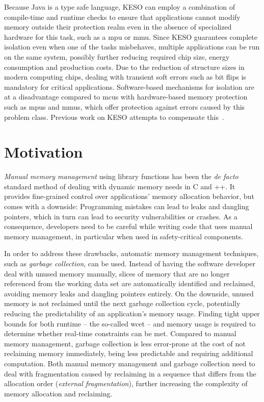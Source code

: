 		Because Java is a type safe language, KESO can employ a combination of compile-time and runtime checks to ensure
		that applications cannot modify memory outside their protection realm even in the absence of specialized hardware
		for this task, such as a \gls{mpu} or \gls{mmu}. Since KESO guarantees complete isolation even when one of the tasks
		misbehaves, multiple applications can be run on the same system, possibly further reducing required chip size,
		energy consumption and production costs. Due to the reduction of structure sizes in modern computing chips, dealing
		with transient soft errors such as bit flips is mandatory for critical applications. Software-based mechanisms for
		isolation are at a disadvantage compared to \glspl{mcu} with hardware-based memory protection such as \glspl{mpu}
		and \glspl{mmu}, which offer protection against errors caused by this problem class. Previous work on KESO attempts
		to compensate this~\cite{thomm:11:jtres, stilkerich:13:lctes}.

	\section{Motivation}
		\label{sec:intro:motivation}

		\emph{Manual memory management} using library functions has been the \emph{de facto} standard method of dealing with
		dynamic memory needs in C and \C++{}. It provides fine-grained control over applications' memory allocation
		behavior, but comes with a downside: Programming mistakes can lead to leaks and dangling pointers, which in turn can
		lead to security vulnerabilities or crashes. As a consequence, developers need to be careful while writing code that
		uses manual memory management, in particular when used in safety-critical components.

		In order to address these drawbacks, automatic memory management techniques, such as \emph{garbage collection}, can
		be used. Instead of having the software developer deal with unused memory manually, slices of memory that are no
		longer referenced from the working data set are automatically identified and reclaimed, avoiding memory leaks and
		dangling pointers entirely. On the downside, unused memory is not reclaimed until the next garbage collection cycle,
		potentially reducing the predictability of an application's memory usage. Finding tight upper bounds for both
		runtime – the so-called \gls{wcet} – and memory usage is required to determine whether real-time constraints can be
		met. Compared to manual memory management, garbage collection is less error-prone at the cost of not reclaiming
		memory immediately, being less predictable and requiring additional computation. Both manual memory management and
		garbage collection need to deal with fragmentation caused by reclaiming in a sequence that differs from the
		allocation order (\emph{external fragmentation}), further increasing the complexity of memory allocation and
		reclaiming.


